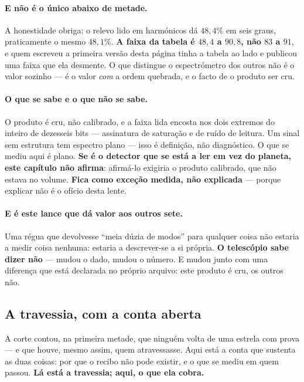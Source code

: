 \documentclass[11pt]{article}
\theoremstyle{plain}
\theoremstyle{remark}
\begin{document}
\paragraph{E não é o único abaixo de metade.} A honestidade obriga: o relevo
lido em harmónicos dá $48{,}4\%$ em seis graus, praticamente o mesmo
$48{,}1\%$. \textbf{A faixa da tabela é $48{,}4$ a $90{,}8$, não $83$ a $91$},
e quem escreveu a primeira versão desta página tinha a tabela ao lado e
publicou uma faixa que ela desmente. O que distingue o espectrómetro dos
outros não é o valor sozinho --- é o valor \emph{com} a ordem quebrada, e o
facto de o produto ser cru.

\paragraph{O que se sabe e o que não se sabe.} O produto é cru, não calibrado,
e a faixa lida encosta nos dois extremos do inteiro de dezesseis bits ---
assinatura de saturação e de ruído de leitura. Um sinal sem estrutura tem espectro plano --- isso é definição, não
diagnóstico. O que se mediu aqui é plano. \textbf{Se é o detector que se está a
ler em vez do planeta, este capítulo não afirma}: afirmá-lo exigiria o produto
calibrado, que não estava no volume. \textbf{Fica como exceção medida, não explicada} --- porque explicar
não é o ofício desta lente.

\paragraph{E é este lance que dá valor aos outros sete.} Uma régua que
devolvesse ``meia dúzia de modos'' para qualquer coisa não estaria a medir
coisa nenhuma: estaria a descrever-se a si própria. \textbf{O telescópio sabe
dizer não} --- mudou o dado, mudou o número. E mudou junto com uma diferença
que está declarada no próprio arquivo: este produto é cru, os outros não.

\subsection{A travessia, com a conta aberta}

\noindent A corte contou, na primeira metade, que ninguém volta de uma estrela com prova ---
e que houve, mesmo assim, quem atravessasse. Aqui está a conta que sustenta as duas coisas: por que
o recibo não pode existir, e o que se mediu em quem passou. \textbf{Lá está a travessia; aqui, o que
ela cobra.}
\end{document}
